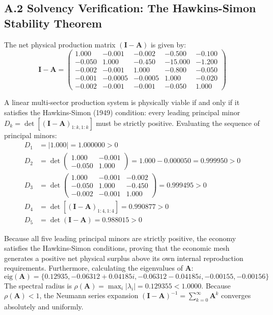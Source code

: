 \documentclass[preprint,12pt,authoryear]{elsarticle}
\theoremstyle{definition}
\begin{document}
\subsection*{A.2 Solvency Verification: The Hawkins-Simon Stability Theorem}

The net physical production matrix $(\mathbf{I} - \mathbf{A})$ is given by:
\begin{equation}
\mathbf{I} - \mathbf{A} = \begin{pmatrix} 
1.000 & -0.001 & -0.002 & -0.500 & -0.100 \\ 
-0.050 & 1.000 & -0.450 & -15.000 & -1.200 \\ 
-0.002 & -0.001 & 1.000 & -0.800 & -0.050 \\ 
-0.001 & -0.0005 & -0.0005 & 1.000 & -0.020 \\ 
-0.002 & -0.001 & -0.001 & -0.050 & 1.000 
\end{pmatrix} \label{eq:I_minus_A}
\end{equation}

A linear multi-sector production system is physically viable if and only if it satisfies the Hawkins-Simon (1949) condition: every leading principal minor $D_k = \det[(\mathbf{I} - \mathbf{A})_{1:k, 1:k}]$ must be strictly positive. Evaluating the sequence of principal minors:
\begin{align*}
D_1 &= |1.000| = 1.000000 > 0 \\
D_2 &= \det \begin{pmatrix} 1.000 & -0.001 \\ -0.050 & 1.000 \end{pmatrix} = 1.000 - 0.000050 = 0.999950 > 0 \\
D_3 &= \det \begin{pmatrix} 1.000 & -0.001 & -0.002 \\ -0.050 & 1.000 & -0.450 \\ -0.002 & -0.001 & 1.000 \end{pmatrix} = 0.999495 > 0 \\
D_4 &= \det[(\mathbf{I} - \mathbf{A})_{1:4, 1:4}] = 0.990877 > 0 \\
D_5 &= \det(\mathbf{I} - \mathbf{A}) = 0.988015 > 0
\end{align*}

Because all five leading principal minors are strictly positive, the economy satisfies the Hawkins-Simon conditions, proving that the economic mesh generates a positive net physical surplus above its own internal reproduction requirements. Furthermore, calculating the eigenvalues of $\mathbf{A}$:
$$\text{eig}(\mathbf{A}) = \{0.12935, -0.06312 + 0.04185i, -0.06312 - 0.04185i, -0.00155, -0.00156\}$$
The spectral radius is $\rho(\mathbf{A}) = \max_i |\lambda_i| = 0.129355 < 1.0000$. Because $\rho(\mathbf{A}) < 1$, the Neumann series expansion $(\mathbf{I} - \mathbf{A})^{-1} = \sum_{k=0}^\infty \mathbf{A}^k$ converges absolutely and uniformly.
\end{document}
